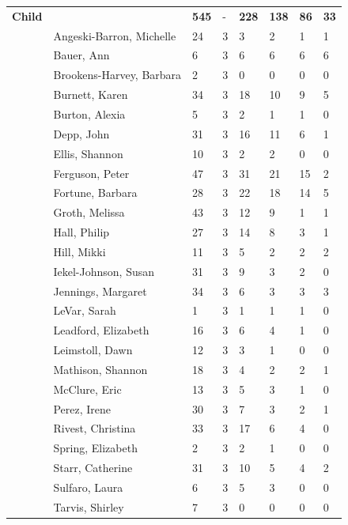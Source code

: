 \documentclass{article}\usepackage[]{graphicx}\usepackage[]{color}
\begin{document}
{\begin{longtable} { >{\raggedright}p{}p{}p{}p{}p{}p{}p{}p{}}
\textbf{Child} &  & \textbf{545} & - & \textbf{228} & \textbf{138} & \textbf{86} & \textbf{33} \\ 
   & Angeski-Barron, Michelle & 24 & 3 & 3 & 2 & 1 & 1 \\ 
   & Bauer, Ann & 6 & 3 & 6 & 6 & 6 & 6 \\ 
   & Brookens-Harvey, Barbara & 2 & 3 & 0 & 0 & 0 & 0 \\ 
   \rowcolor[gray]{0.90} & Burnett, Karen & 34 & 3 & 18 & 10 & 9 & 5 \\ 
   \rowcolor[gray]{0.90} & Burton, Alexia & 5 & 3 & 2 & 1 & 1 & 0 \\ 
   \rowcolor[gray]{0.90} & Depp, John & 31 & 3 & 16 & 11 & 6 & 1 \\ 
   & Ellis, Shannon & 10 & 3 & 2 & 2 & 0 & 0 \\ 
   & Ferguson, Peter & 47 & 3 & 31 & 21 & 15 & 2 \\ 
   & Fortune, Barbara & 28 & 3 & 22 & 18 & 14 & 5 \\ 
   \rowcolor[gray]{0.90} & Groth, Melissa & 43 & 3 & 12 & 9 & 1 & 1 \\ 
   \rowcolor[gray]{0.90} & Hall, Philip & 27 & 3 & 14 & 8 & 3 & 1 \\ 
   \rowcolor[gray]{0.90} & Hill, Mikki & 11 & 3 & 5 & 2 & 2 & 2 \\ 
   & Iekel-Johnson, Susan & 31 & 3 & 9 & 3 & 2 & 0 \\ 
   & Jennings, Margaret & 34 & 3 & 6 & 3 & 3 & 3 \\ 
   & LeVar, Sarah & 1 & 3 & 1 & 1 & 1 & 0 \\ 
   \rowcolor[gray]{0.90} & Leadford, Elizabeth & 16 & 3 & 6 & 4 & 1 & 0 \\ 
   \rowcolor[gray]{0.90} & Leimstoll, Dawn & 12 & 3 & 3 & 1 & 0 & 0 \\ 
   \rowcolor[gray]{0.90} & Mathison, Shannon & 18 & 3 & 4 & 2 & 2 & 1 \\ 
   & McClure, Eric & 13 & 3 & 5 & 3 & 1 & 0 \\ 
   & Perez, Irene & 30 & 3 & 7 & 3 & 2 & 1 \\ 
   & Rivest, Christina & 33 & 3 & 17 & 6 & 4 & 0 \\ 
   \rowcolor[gray]{0.90} & Spring, Elizabeth & 2 & 3 & 2 & 1 & 0 & 0 \\ 
   \rowcolor[gray]{0.90} & Starr, Catherine & 31 & 3 & 10 & 5 & 4 & 2 \\ 
   \rowcolor[gray]{0.90} & Sulfaro, Laura & 6 & 3 & 5 & 3 & 0 & 0 \\ 
   & Tarvis, Shirley & 7 & 3 & 0 & 0 & 0 & 0 \\ 

\end{longtable}}
\end{document}
